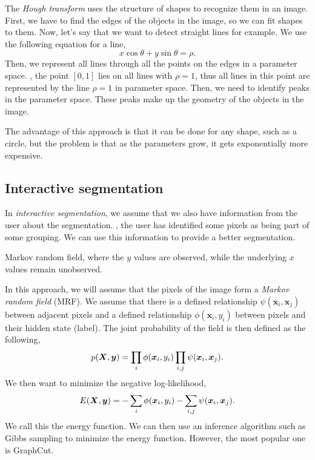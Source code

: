 The \textit{Hough transform} uses the structure of shapes to recognize them in
an image. First, we have to find the edges of the objects in the image, so we
can fit shapes to them. Now, let's say that we want to detect straight lines
for example. We use the following equation for a line, \[
    x\cos\theta + y\sin\theta = \rho.
\]
Then, we represent all lines through all the points on the edges in a
parameter space. \Eg, the point $[0,1]$ lies on all lines with $\rho=1$, thus
all lines in this point are represented by the line $\rho=1$ in parameter
space. Then, we need to identify peaks in the parameter space. These peaks
make up the geometry of the objects in the image.

The advantage of this approach is that it can be done for any shape, such as
a circle, but the problem is that as the parameters grow, it gets
exponentially more expensive.

\subsection{Interactive segmentation}

In \textit{interactive segmentation}, we assume that we also have information
from the user about the segmentation. \Ie, the user has identified some pixels
as being part of some grouping. We can use this information to provide a better
segmentation.

\begin{marginfigure}
    \centering
    \caption{Markov random field, where the $y$ values are observed, while the underlying $x$ values remain unobserved.}
    \label{fig:mrf}
\end{marginfigure}

In this approach, we will assume that the pixels of the image form a
\textit{Markov random field} (MRF). We assume that there is a defined
relationship $\psi(\bm{x}_i,\bm{x}_j)$ between adjacent pixels and a defined
relationship $\phi(\bm{x}_i,y_i)$ between pixels and their hidden state
(label). The joint probability of the field is then defined as the following,
\[
    p(\bm{X},\bm{y}) = \prod_i \phi(\bm{x}_i,y_i) \prod_{i,j} \psi(\bm{x}_i,\bm{x}_j).
\]
We then want to minimize the negative log-likelihood, \[
    E(\bm{X},\bm{y}) = -\sum_i \phi(\bm{x}_i,y_i) -\sum_{i,j} \psi(\bm{x}_i,\bm{x}_j).
\]
We call this the energy function. We can then use an inference algorithm such
as Gibbs sampling to minimize the energy function. However, the most popular
one is GraphCut.

